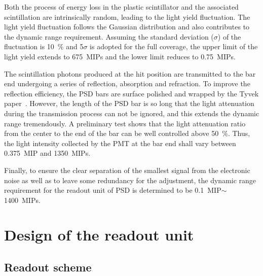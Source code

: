 \documentclass[preprint, times]{elsarticle}
\begin{document}
Both the process of energy loss in the plastic scintillator and the associated scintillation are intrinsically random, leading to the light yield fluctuation.
The light yield fluctuation follows the Gaussian distribution and also contributes to the dynamic range requirement.
Assuming the standard deviation ($\sigma$) of the fluctuation is \SI{10}{\percent} and 5$\sigma$ is adopted for the full coverage, the upper limit of the light yield extends to \SI{675}{MIPs} and the lower limit reduces to \SI{0.75}{MIPs}.

The scintillation photons produced at the hit position are transmitted to the bar end undergoing a series of reflection, absorption and refraction.
To improve the reflection efficiency, the PSD bars are surface polished and wrapped by the Tyvek paper~\cite{tyvek}. 
However, the length of the PSD bar is so long that the light attenuation during the transmission process can not be ignored, and this extends the dynamic range tremendously.
A preliminary test shows that the light attenuation ratio from the center to the end of the bar can be well controlled above \SI{50}{\percent}. 
Thus, the light intensity collected by the PMT at the bar end shall vary between \SI{0.375}{MIP} and \SI{1350}{MIPs}.

Finally, to ensure the clear separation of the smallest signal from the electronic noise as well as to leave some redundancy for the adjustment, the dynamic range requirement for the readout unit of PSD is determined to be \SI{0.1}{MIP}$\sim$\SI{1400}{MIPs}.

\section{Design of the readout unit}
\label{sec:design}

\subsection{Readout scheme}
\label{sec:scheme}
\end{document}
